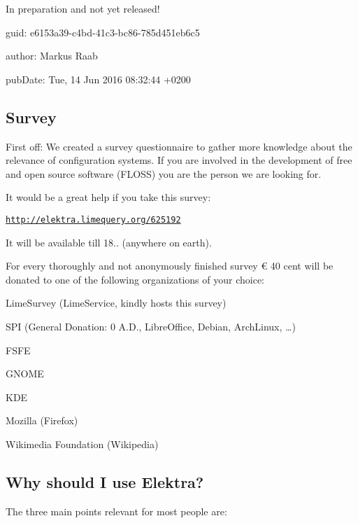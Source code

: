 In preparation and not yet released!


\begin{DoxyItemize}
\item guid\+: e6153a39-\/c4bd-\/41c3-\/bc86-\/785d451eb6c5
\item author\+: Markus Raab
\item pub\+Date\+: Tue, 14 Jun 2016 08\+:32\+:44 +0200
\end{DoxyItemize}

\subsection*{Survey}

First off\+: We created a survey questionnaire to gather more knowledge about the relevance of configuration systems. If you are involved in the development of free and open source software (F\+L\+O\+S\+S) you are the person we are looking for.

It would be a great help if you take this survey\+:

\href{http://elektra.limequery.org/625192}{\tt http\+://elektra.\+limequery.\+org/625192}

It will be available till 18.. (anywhere on earth).

For every thoroughly and not anonymously finished survey € 40 cent will be donated to one of the following organizations of your choice\+:


\begin{DoxyItemize}
\item Lime\+Survey (Lime\+Service, kindly hosts this survey)
\item S\+P\+I (General Donation\+: 0 A.\+D., Libre\+Office, Debian, Arch\+Linux, …)
\item F\+S\+F\+E
\item G\+N\+O\+M\+E
\item K\+D\+E
\item Mozilla (Firefox)
\item Wikimedia Foundation (Wikipedia)
\end{DoxyItemize}

\subsection*{Why should I use Elektra?}

The three main points relevant for most people are\+:


